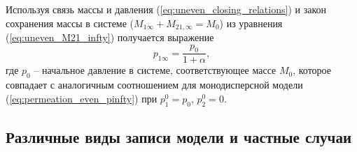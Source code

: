 Используя связь массы и давления (\ref{eq:uneven_closing_relations}) и закон сохранения массы в системе ($M_{1\infty}+M_{21,\infty}=M_0$) из уравнения (\ref{eq:uneven_M21_infty}) получается выражение 
\begin{equation}
\label{eq:uneven_M1_infty}
p_{1\infty} = \frac{p_0}{1+\alpha},
\end{equation}
где $p_0$ -- начальное давление в системе, соответствующее массе $M_0$, которое совпадает с аналогичным соотношением для монодисперсной модели (\ref{eq:permeation_even_pinfty}) при $p_1^0=p_0$, $p_2^0=0$.


\subsection{Различные виды записи модели и частные случаи}
\label{section_2_3_3}


